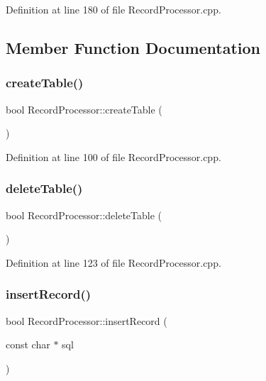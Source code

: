 Definition at line 180 of file Record\+Processor.\+cpp.



\subsection{Member Function Documentation}
\mbox{\label{class_record_processor_a2c919a73f9cd411c141635f35dd047be}} 
\subsubsection{\texorpdfstring{create\+Table()}{createTable()}}
{\footnotesize\ttfamily bool Record\+Processor\+::create\+Table (\begin{DoxyParamCaption}{ }\end{DoxyParamCaption})}



Definition at line 100 of file Record\+Processor.\+cpp.

\mbox{\label{class_record_processor_a6739098423e2d913004459282217db2e}} 
\subsubsection{\texorpdfstring{delete\+Table()}{deleteTable()}}
{\footnotesize\ttfamily bool Record\+Processor\+::delete\+Table (\begin{DoxyParamCaption}{ }\end{DoxyParamCaption})}



Definition at line 123 of file Record\+Processor.\+cpp.

\mbox{\label{class_record_processor_a6101b13cf5883e1fefe3013947ca9b68}} 
\subsubsection{\texorpdfstring{insert\+Record()}{insertRecord()}}
{\footnotesize\ttfamily bool Record\+Processor\+::insert\+Record (\begin{DoxyParamCaption}\item[{const char $\ast$}]{sql }\end{DoxyParamCaption})}



